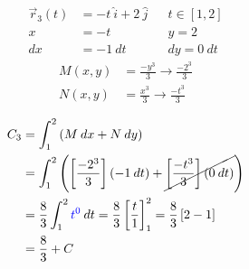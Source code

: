 \documentclass{article}
\begin{document}
\begin{center}
\noindent\begin{minipage}{0.4\linewidth}
    \begin{equation*}
    \begin{aligned}
        \vec{r}_3(t) &= -t\:\hat{i} + 2\:\hat{j} && t \in \left[1, 2\right] \\
        x &= -t && y = 2 \\
        dx &= -1\:dt && dy = 0\:dt
    \end{aligned}
    \end{equation*}
    \begin{equation*}
    \begin{aligned}
        M(x, y) &= \frac{-y^3}{3} \to \frac{-2^3}{3} \\
        N(x, y) &= \frac{x^3}{3} \to \frac{-t^3}{3}
    \end{aligned}
    \end{equation*}
\end{minipage}
\begin{minipage}{0.4\linewidth}
    \begin{equation*}
    \begin{aligned}
        C_3 &= \int_1^2{\left(M\:dx + N\:dy\right)} \\
        &= \int_1^2{\left(\left[\frac{-2^3}{3}\right]\left(-1\:dt\right) + \cancel{\left[\frac{-t^3}{3}\right]\left(0\:dt\right)}\right)} \\
        &= \frac{8}{3}\int_1^2{\textcolor{blue}{t^0}\:dt} = \frac{8}{3}\left[\frac{t}{1}\right]_1^2 = \frac{8}{3}\left[2 - 1\right] \\
        &= \frac{8}{3} + C
    \end{aligned}
    \end{equation*}
\end{minipage}
\end{center}
\end{document}
